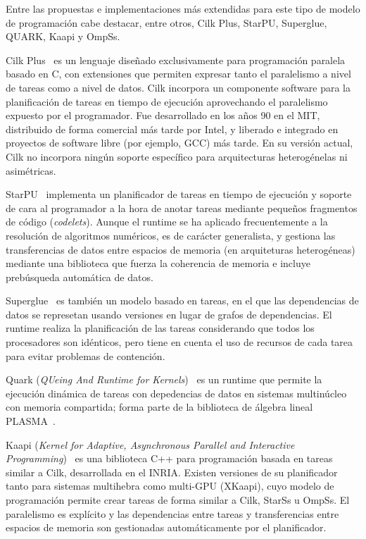 Entre las propuestas e implementaciones más extendidas para este tipo de modelo de programación cabe
destacar, entre otros, Cilk Plus, StarPU, Superglue, QUARK, Kaapi y OmpSs. 

Cilk Plus~\cite{cilkweb,Blumofe:Cilk,Frigo:Cilk,Leiserson:Cilk} es un lenguaje diseñado exclusivamente
para programación paralela basado en C, con extensiones que permiten expresar tanto el paralelismo a nivel
de tareas como a nivel de datos. Cilk incorpora un componente software para la planificación de tareas
en tiempo de ejecución aprovechando el paralelismo expuesto por el programador. Fue desarrollado en los
años 90 en el MIT, distribuido de forma comercial más tarde por Intel, y liberado e integrado en proyectos
de software libre (por ejemplo, GCC) más tarde. En su versión actual, Cilk no incorpora ningún soporte 
específico para arquitecturas heterogénelas ni asimétricas.

StarPU~\cite{starpuweb,Augonnet:2011:SUP:1951453.1951454,agullo:hal-01223573,agullo:hal-01120507} implementa un planificador de tareas en tiempo de ejecución y soporte de cara al programador
a la hora de anotar tareas mediante pequeños fragmentos de código ({\em codelets}). Aunque el runtime se ha
aplicado frecuentemente a la resolución de algoritmos numéricos, es de carácter generalista, y gestiona
las transferencias de datos entre espacios de memoria (en arquiteturas heterogéneas) mediante
una biblioteca que fuerza la coherencia de memoria e incluye prebúsqueda automática de datos.

Superglue~\cite{superglueweb,tillenius:superglue,tillenius:superglue2} es también un modelo basado en tareas, en el que las
dependencias de datos se represetan usando versiones en lugar de grafos de dependencias. El runtime 
realiza la planificación de las tareas considerando que todos los procesadores
son idénticos, pero tiene en cuenta el uso de recursos de cada tarea para evitar problemas
de contención.

Quark ({\em QUeing And Runtime for Kernels})~\cite{quarkweb,icl:609,Haidar} es un runtime que permite la 
ejecución dinámica de tareas con depedencias de datos en sistemas multinúcleo
con memoria compartida; forma parte de la biblioteca de álgebra lineal PLASMA~\cite{Abalenkovs}.

Kaapi ({\em Kernel for Adaptive, Asynchronous Parallel and Interactive Programming})~\cite{kaapiweb,Gautier:2013:XRS:2510661.2511383,Gautier:2007:KTS:1278177.1278182}
es una biblioteca C++ para programación basada en tareas similar a Cilk, desarrollada en el INRIA.
Existen versiones de su planificador tanto para sistemas multihebra como multi-GPU (XKaapi), cuyo
modelo de programación permite crear tareas de forma similar a Cilk, StarSs u OmpSs. El paralelismo
es explícito y las dependencias entre tareas y transferencias entre espacios de memoria son 
gestionadas automáticamente por el planificador.

